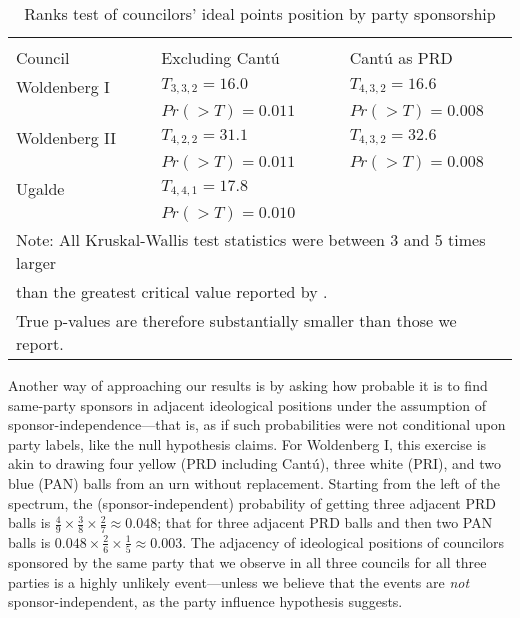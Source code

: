 \documentclass[12 pt, letter]{article}
\begin{document}
\begin{table}
\caption{Ranks test of councilors' ideal points position by party
sponsorship}\label{T:kw}
\begin{center}
\begin{tabular}{lclcl}
\hline\\[-1.5ex]
Council       && Excluding Cant\'u  && Cant\'u as PRD     \\  \hline
Woldenberg I  && $T_{3,3,2}=16.0$   && $T_{4,3,2}=16.6$   \\
              && $Pr(>T)=0.011$     && $Pr(>T)=0.008$     \\
Woldenberg II && $T_{4,2,2}=31.1$   && $T_{4,3,2}=32.6$   \\
              && $Pr(>T)=0.011$     && $Pr(>T)=0.008$     \\
Ugalde        && $T_{4,4,1}=17.8$   &&                    \\
              && $Pr(>T)=0.010$     &&                    \\  \hline
\multicolumn{5}{l}{\footnotesize{{\sc Note}: All Kruskal-Wallis test statistics were between 3 and 5 times larger}}\\
\multicolumn{5}{l}{\footnotesize{than the greatest critical value reported by \citet[][Table A.12]{Daniel1990}.}}\\
\multicolumn{5}{l}{\footnotesize{True p-values are therefore substantially smaller than those we report.}}\\
\end{tabular}
\end{center}
\end{table}

Another way of approaching our results is by asking how probable it
is to find same-party sponsors in adjacent ideological positions
under the assumption of sponsor-independence---that is, as if such
probabilities were not conditional upon party labels, like the null
hypothesis claims. For Woldenberg I, this exercise is akin to
drawing four yellow (PRD including Cant\'u), three white (PRI), and
two blue (PAN) balls from an urn without replacement. Starting from
the left of the spectrum, the (sponsor-independent) probability of
getting three adjacent PRD balls is $\frac{4}{9} \times \frac{3}{8}
\times \frac{2}{7} \approx 0.048$; that for three adjacent PRD balls
and then two PAN balls is $0.048 \times \frac{2}{6} \times
\frac{1}{5} \approx 0.003$.  The adjacency of ideological positions
of councilors sponsored by the same party that we observe in all
three councils for all three parties is a highly unlikely
event---unless we believe that the events are \emph{not}
sponsor-independent, as the party influence hypothesis suggests.
\end{document}
